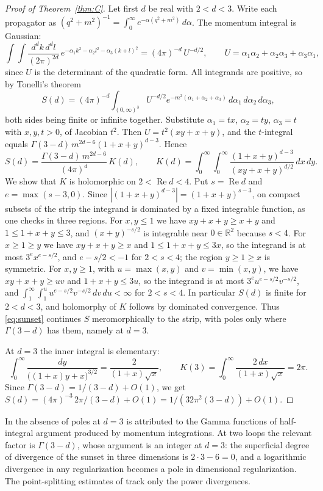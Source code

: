 \documentclass[11pt]{amsart}
\theoremstyle{definition}
\newcommand{\RR}{\mathbb{R}}
\begin{document}
\begin{proof}[Proof of Theorem~\ref{thm:C}]
Let first $d$ be real with $2<d<3$. Write each propagator as $(q^2+m^2)^{-1}=\int_0^\infty e^{-\alpha(q^2+m^2)}\,d\alpha$. The momentum integral is Gaussian:
\[
\int\!\!\int\frac{d^dk\,d^dl}{(2\pi)^{2d}}\,e^{-\alpha_1k^2-\alpha_2l^2-\alpha_3(k+l)^2}=(4\pi)^{-d}\,U^{-d/2},\qquad U=\alpha_1\alpha_2+\alpha_2\alpha_3+\alpha_3\alpha_1,
\]
since $U$ is the determinant of the quadratic form. All integrands are positive, so by Tonelli's theorem
\[
S(d)=(4\pi)^{-d}\int_{(0,\infty)^3}U^{-d/2}e^{-m^2(\alpha_1+\alpha_2+\alpha_3)}\,d\alpha_1\,d\alpha_2\,d\alpha_3 ,
\]
both sides being finite or infinite together. Substitute $\alpha_1=tx$, $\alpha_2=ty$, $\alpha_3=t$ with $x,y,t>0$, of Jacobian $t^2$. Then $U=t^2(xy+x+y)$, and the $t$-integral equals $\Gamma(3-d)\,m^{2d-6}(1+x+y)^{d-3}$. Hence
\begin{equation}\label{eq:sunset}
S(d)=\frac{\Gamma(3-d)\,m^{2d-6}}{(4\pi)^d}\,K(d),\qquad K(d)=\int_0^\infty\!\!\int_0^\infty\frac{(1+x+y)^{d-3}}{(xy+x+y)^{d/2}}\,dx\,dy .
\end{equation}
We show that $K$ is holomorphic on $2<\operatorname{Re}d<4$. Put $s=\operatorname{Re}d$ and $e=\max(s-3,0)$. Since $|(1+x+y)^{d-3}|=(1+x+y)^{s-3}$, on compact subsets of the strip the integrand is dominated by a fixed integrable function, as one checks in three regions. For $x,y\le1$ we have $xy+x+y\ge x+y$ and $1\le1+x+y\le3$, and $(x+y)^{-s/2}$ is integrable near $0\in\RR^2$ because $s<4$. For $x\ge1\ge y$ we have $xy+x+y\ge x$ and $1\le1+x+y\le3x$, so the integrand is at most $3^{e}x^{e-s/2}$, and $e-s/2<-1$ for $2<s<4$; the region $y\ge1\ge x$ is symmetric. For $x,y\ge1$, with $u=\max(x,y)$ and $v=\min(x,y)$, we have $xy+x+y\ge uv$ and $1+x+y\le3u$, so the integrand is at most $3^{e}u^{e-s/2}v^{-s/2}$, and $\int_1^\infty\!\int_1^u u^{e-s/2}v^{-s/2}\,dv\,du<\infty$ for $2<s<4$. In particular $S(d)$ is finite for $2<d<3$, and holomorphy of $K$ follows by dominated convergence. Thus \eqref{eq:sunset} continues $S$ meromorphically to the strip, with poles only where $\Gamma(3-d)$ has them, namely at $d=3$.

At $d=3$ the inner integral is elementary:
\[
\int_0^\infty\frac{dy}{\big((1+x)y+x\big)^{3/2}}=\frac{2}{(1+x)\sqrt{x}},\qquad K(3)=\int_0^\infty\frac{2\,dx}{(1+x)\sqrt x}=2\pi .
\]
Since $\Gamma(3-d)=1/(3-d)+O(1)$, we get $S(d)=(4\pi)^{-3}\,2\pi/(3-d)+O(1)=1/(32\pi^2(3-d))+O(1)$.
\end{proof}

In \cite{Kak00} the absence of poles at $d=3$ is attributed to the Gamma functions of half-integral argument produced by momentum integrations. At two loops the relevant factor is $\Gamma(3-d)$, whose argument is an integer at $d=3$: the superficial degree of divergence of the sunset in three dimensions is $2\cdot3-6=0$, and a logarithmic divergence in any regularization becomes a pole in dimensional regularization. The point-splitting estimates of \cite{Kak00} track only the power divergences.
\end{document}
